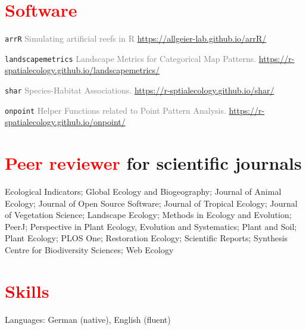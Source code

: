 \documentclass[hidelinks]{report}
\begin{document}

\section*{\textcolor{red}{Software} \sout{\hfill}}

\texttt{arrR} \textcolor{grey}{Simulating artificial reefs in R}
\hfill
\textcolor{green}{\href{https://allgeier-lab.github.io/arrR/}{https://allgeier-lab.github.io/arrR/}}

\texttt{landscapemetrics} \textcolor{grey}{Landscape Metrics for Categorical Map Patterns.}
\hfill
\textcolor{green}{\href{https://r-spatialecology.github.io/landscapemetrics/}{https://r-spatialecology.github.io/landscapemetrics/}}

\texttt{shar} \textcolor{grey}{Species-Habitat Associations.}
\hfill
\textcolor{green}{\href{https://r-sptialecology.github.io/shar/}{https://r-sptialecology.github.io/shar/}}

\texttt{onpoint} \textcolor{grey}{Helper Functions related to Point Pattern Analysis.}
\hfill
\textcolor{green}{\href{https://r-spatialecology.github.io/onpoint/}{https://r-spatialecology.github.io/onpoint/}}



\section*{\textcolor{red}{Peer reviewer} for scientific journals \sout{\hfill}}

Ecological Indicators;
Global Ecology and Biogeography;
Journal of Animal Ecology;
Journal of Open Source Software;
Journal of Tropical Ecology;
Journal of Vegetation Science;
Landscape Ecology;
Methods in Ecology and Evolution;
PeerJ;
Perspective in Plant Ecology, Evolution and Systematics;
Plant and Soil;
Plant Ecology;
PLOS One;
Restoration Ecology;
Scientific Reports;
Synthesis Centre for Biodiversity Sciences;
Web Ecology



\section*{\textcolor{red}{Skills} \sout{\hfill}}

Languages: German (native), English (fluent)
\end{document}

